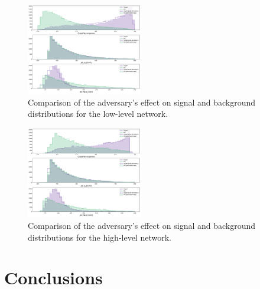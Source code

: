 \documentclass[reprint,nofootinbib,...]{revtex4-1}
\begin{document}
\begin{figure}[h!]
\centering
\includegraphics[width=0.45\textwidth]{figures/adv_classifer_response.pdf}
\caption{
Comparison of the adversary's effect on signal and background distributions for the low-level network.
}
\end{figure}

\begin{figure}[h!]
\centering
\includegraphics[width=0.45\textwidth]{figures/adv_classifer_response_HL.pdf}
\caption{
Comparison of the adversary's effect on signal and background distributions for the high-level network.
}
\end{figure}


\clearpage

\section{Conclusions}
\end{document}
